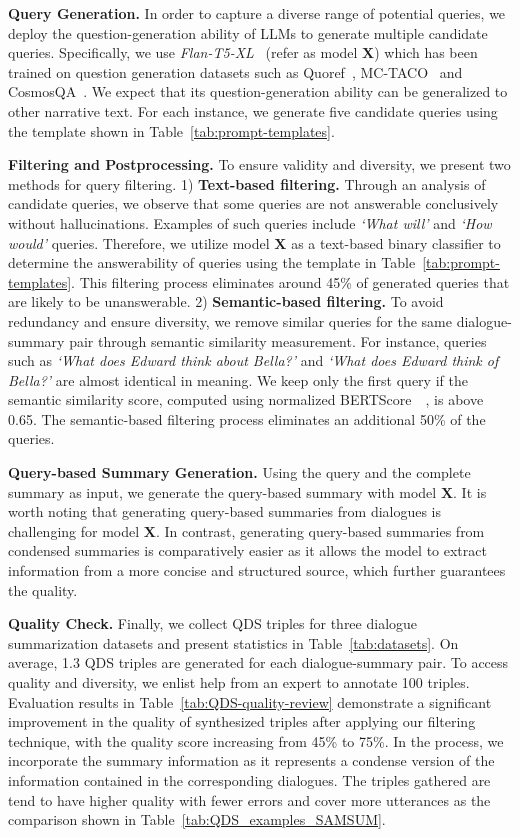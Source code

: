 \documentclass[11pt]{article}
\begin{document}
        \textbf{Query Generation.} In order to capture a diverse range of potential queries, we deploy the question-generation ability of LLMs to generate multiple candidate queries. Specifically, we use \emph{Flan-T5-XL}~\cite{chung2022scaling} (refer as model $\bm{X}$) which has been trained on question generation datasets such as Quoref~\cite{dasigi-etal-2019-quoref}, MC-TACO~\cite{zhou-etal-2019-going} and CosmosQA~\cite{huang-etal-2019-cosmos}. We expect that its question-generation ability can be generalized to other narrative text. For each instance, we generate five candidate queries using the template shown in Table~\ref{tab:prompt-templates}.

        \textbf{Filtering and Postprocessing.} To ensure validity and diversity, we present two methods for query filtering. 1) \textbf{Text-based filtering.} Through an analysis of candidate queries, we observe that some queries are not answerable conclusively without hallucinations. Examples of such queries include \emph{`What will'} and \emph{`How would'} queries. Therefore, we utilize model $\bm{X}$ as a text-based binary classifier to determine the answerability of queries using the template in Table~\ref{tab:prompt-templates}. This filtering process eliminates around 45\% of generated queries that are likely to be unanswerable. 2) \textbf{Semantic-based filtering.} To avoid redundancy and ensure diversity, we remove similar queries for the same dialogue-summary pair through semantic similarity measurement. For instance, queries such as \emph{`What does Edward think about Bella?'} and \emph{`What does Edward think of Bella?'} are almost identical in meaning. We keep only the first query if the semantic similarity score, computed using normalized BERTScore~~\cite{bert-score}, is above 0.65. The semantic-based filtering process eliminates an additional 50\% of the queries.

        \textbf{Query-based Summary Generation.} Using the query and the complete summary as input, we generate the query-based summary with model $\bm{X}$. It is worth noting that generating query-based summaries from dialogues is challenging for model $\bm{X}$. In contrast, generating query-based summaries from condensed summaries is comparatively easier as it allows the model to extract information from a more concise and structured source, which further guarantees the quality.


        \textbf{Quality Check.} Finally, we collect QDS triples for three dialogue summarization datasets and present statistics in Table~\ref{tab:datasets}. On average, 1.3 QDS triples are generated for each dialogue-summary pair. To access quality and diversity, we enlist help from an expert to annotate 100 triples. Evaluation results in Table~\ref{tab:QDS-quality-review} demonstrate a significant improvement in the quality of synthesized triples after applying our filtering technique, with the quality score increasing from 45\% to 75\%. In the process, we incorporate the summary information as it represents a condense version of the information contained in the corresponding dialogues. The triples gathered are tend to have higher quality with fewer errors and cover more utterances as the comparison shown in Table~\ref{tab:QDS_examples_SAMSUM}.
        
\end{document}
